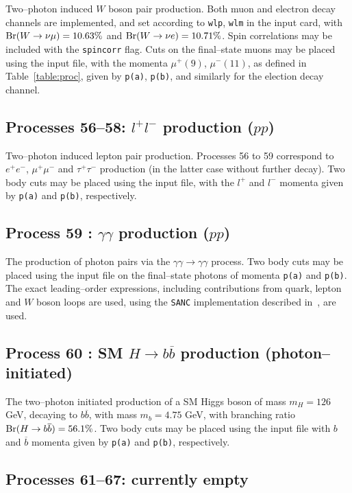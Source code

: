 \documentclass[12pt]{article}
\begin{document}
Two--photon induced $W$ boson pair production. Both muon and electron decay channels are implemented, and set according to \texttt{wlp}, 
\texttt{wlm} in the input card, with ${\rm Br}(W\to \nu \mu)=10.63\%$ and ${\rm Br}(W\to \nu e)=10.71\%$. Spin correlations may be  included with 
the \texttt{spincorr} flag. Cuts on the final--state muons may be placed using the input file, with the momenta $\mu^+(9)$, $\mu^-(11)$, as 
defined in Table~\ref{table:proc}, given by \texttt{p(a)}, \texttt{p(b)},  and similarly for the election decay channel.

\subsection{Processes 56--58: $l^+l^-$ production ($pp$)}

Two--photon induced lepton pair production. Processes 56 to 59 correspond to $e^+e^-$, $\mu^+\mu^-$ and $\tau^+\tau^-$ production (in the latter 
case without further decay).  Two body cuts may be placed using the input file, with the $l^+$ and $l^-$ momenta given by \texttt{p(a)} and 
\texttt{p(b)}, respectively.


\subsection{Process 59 : $\gamma\gamma$ production ($pp$)}

The production of photon pairs via the $\gamma \gamma \to\gamma\gamma$ process. Two body cuts may be placed using the input file on the 
final--state photons of momenta  \texttt{p(a)} and \texttt{p(b)}.  
The exact leading--order expressions, including contributions from quark, lepton and $W$ boson loops are used, using the \texttt{SANC} implementation
 described in~\cite{Bardin:2009gq}, are used.

\subsection{Process 60 : SM $H\to b\overline{b}$ production (photon--initiated)}

The two--photon initiated production of a SM Higgs boson of mass $m_H=126$ GeV, decaying to $b\overline{b}$, with mass $m_b=4.75$ GeV, with 
branching ratio ${\rm Br}(H\to b\overline{b})=56.1\%$. Two body cuts may be placed using the input file with $b$ and $\overline{b}$ momenta 
given by \texttt{p(a)} and \texttt{p(b)}, respectively.

\subsection{Processes 61--67: currently empty}
\end{document}
